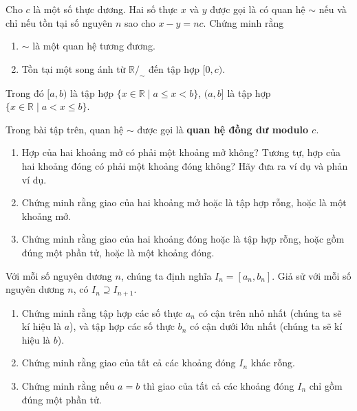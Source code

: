 \begin{exercise}
	Cho $c$ là một số thực dương. Hai số thực $x$ và $y$ được gọi là có quan hệ $\sim$ nếu và chỉ nếu tồn tại số nguyên $n$ sao cho $x - y = nc$. Chứng minh rằng
	\begin{enumerate}[label={(\roman*)}]
		\item $\sim$ là một quan hệ tương đương.
		\item Tồn tại một song ánh từ $\mathbb{R}/_{\sim}$ đến tập hợp $[0, c)$.
	\end{enumerate}

	Trong đó $[a, b)$ là tập hợp $\{ x\in\mathbb{R} \mid a\leq x < b \}$, $(a, b]$ là tập hợp $\{ x\in\mathbb{R} \mid a < x \leq b \}$.
\end{exercise}

Trong bài tập trên, quan hệ $\sim$ được gọi là \textbf{quan hệ đồng dư modulo $c$}.

\begin{exercise}
	\begin{enumerate}[label={(\roman*)}]
		\item Hợp của hai khoảng mở có phải một khoảng mở không? Tương tự, hợp của hai khoảng đóng có phải một khoảng đóng không? Hãy đưa ra ví dụ và phản ví dụ.
		\item Chứng minh rằng giao của hai khoảng mở hoặc là tập hợp rỗng, hoặc là một khoảng mở.
		\item Chứng minh rằng giao của hai khoảng đóng hoặc là tập hợp rỗng, hoặc gồm đúng một phần tử, hoặc là một khoảng đóng.
	\end{enumerate}
\end{exercise}

\begin{exercise}
	Với mỗi số nguyên dương $n$, chúng ta định nghĩa $I_{n} = [a_{n}, b_{n}]$. Giả sử với mỗi số nguyên dương $n$, có $I_{n} \supseteq I_{n+1}$.
	\begin{enumerate}[label={(\roman*)}]
		\item Chứng minh rằng tập hợp các số thực $a_{n}$ có cận trên nhỏ nhất (chúng ta sẽ kí hiệu là $a$), và tập hợp các số thực $b_{n}$ có cận dưới lớn nhất (chúng ta sẽ kí hiệu là $b$).
		\item Chứng minh rằng giao của tất cả các khoảng đóng $I_{n}$ khác rỗng.
		\item Chứng minh rằng nếu $a = b$ thì giao của tất cả các khoảng đóng $I_{n}$ chỉ gồm đúng một phần tử.
	\end{enumerate}
\end{exercise}

